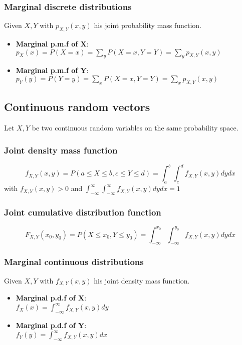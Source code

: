 \subsubsection{Marginal discrete distributions}
Given $X, Y$ with $p_{X,Y}(x,y)$ his joint probability mass function.
\begin{itemize}
    \item \textbf{Marginal p.m.f of X}:
    $p_X(x)=P(X=x)=\sum_yP(X=x,Y=Y)=\sum_yp_{X,Y}(x,y)$
    \item \textbf{Marginal p.m.f of Y}:
    $p_Y(y)=P(Y=y)=\sum_xP(X=x,Y=Y)=\sum_xp_{X,Y}(x,y)$
\end{itemize}


\subsection{Continuous random vectors}
Let $X, Y$ be two continuous random variables on the same probability space.
\subsubsection{Joint density mass function}
\[ f_{X,Y}(x,y)=P(a\leq X \leq b, c\leq Y \leq d) = \int_{a}^b\int_{c}^d
f_{X,Y}(x,y)dydx \] with $f_{X,Y}(x,y)>0$ and
$\int_{-\infty}^\infty\int_{-\infty}^\infty f_{X,Y}(x,y)dydx=1$
\subsubsection{Joint cumulative distribution function}
\[ F_{X,Y}(x_0,y_0)=P(X\leq x_0,Y\leq y_0) =
\int_{-\infty}^{x_0}\int_{-\infty}^{y_0}f_{X,Y}(x,y)dydx \]
\subsubsection{Marginal continuous distributions}
Given $X, Y$ with $f_{X,Y}(x,y)$ his joint density mass function.
\begin{itemize}
    \item \textbf{Marginal p.d.f of X}:\\ $f_X(x)=\int_{-\infty}^\infty
    f_{X,Y}(x,y)dy$
    \item \textbf{Marginal p.d.f of Y}:\\ $f_Y(y)=\int_{-\infty}^\infty
    f_{X,Y}(x,y)dx$
\end{itemize}


